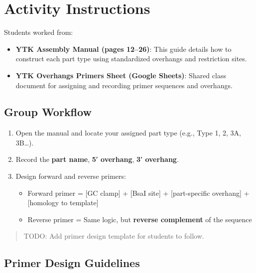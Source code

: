 \documentclass[
  letterpaper,
  DIV=11,
  numbers=noendperiod]{scrreprt}
\providecommand{\tightlist}{%
  \setlength{\itemsep}{0pt}\setlength{\parskip}{0pt}}\usepackage{longtable,booktabs,array}
\begin{document}
\section{Activity Instructions}\label{activity-instructions}

Students worked from:

\begin{itemize}
\tightlist
\item
  \textbf{YTK Assembly Manual (pages 12--26)}: This guide details how to
  construct each part type using standardized overhangs and restriction
  sites.
\item
  \textbf{YTK Overhangs Primers Sheet (Google Sheets)}: Shared class
  document for assigning and recording primer sequences and overhangs.
\end{itemize}

\subsection{Group Workflow}\label{group-workflow}

\begin{enumerate}
\def\labelenumi{\arabic{enumi}.}
\tightlist
\item
  Open the manual and locate your assigned part type (e.g., Type 1, 2,
  3A, 3B\ldots).
\item
  Record the \textbf{part name}, \textbf{5′ overhang}, \textbf{3′
  overhang}.
\item
  Design forward and reverse primers:

  \begin{itemize}
  \tightlist
  \item
    Forward primer = {[}GC clamp{]} + {[}BsaI site{]} + {[}part-specific
    overhang{]} + {[}homology to template{]}
  \item
    Reverse primer = Same logic, but \textbf{reverse complement} of the
    sequence
  \end{itemize}
\end{enumerate}

\begin{quote}
TODO: Add primer design template for students to follow.
\end{quote}

\subsection{Primer Design Guidelines}\label{primer-design-guidelines}
\end{document}
